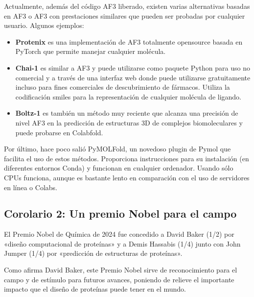 Actualmente, además del código AF3 liberado, existen varias alternativas basadas en AF3 o AF3 con prestaciones similares que pueden ser probadas por cualquier usuario. Algunos ejemplos:
\begin{itemize}
\item \textbf{Protenix} es una implementación de AF3 totalmente opensource basada en PyTorch que permite manejar cualquier molécula.
\item \textbf{Chai-1} es similar a AF3 y puede utilizarse como paquete Python para uso no comercial y a través de una interfaz web donde puede utilizarse gratuitamente incluso para fines comerciales de descubrimiento de fármacos. Utiliza la codificación smiles para la representación de cualquier molécula de ligando.
\item \textbf{Boltz-1} es también un método muy reciente que alcanza una precisión de nivel AF3 en la predicción de estructuras 3D de complejos biomoleculares y puede probarse en Colabfold.
\end{itemize}

Por último, hace poco salió PyMOLFold, un novedoso plugin de Pymol que facilita el uso de estos métodos. Proporciona instrucciones para su instalación (en diferentes entornos Conda) y funcionan en cualquier ordenador. Usando sólo CPUs funciona, aunque es bastante lento en comparación con el uso de servidores en línea o Colabs.

\subsection{Corolario 2: Un premio Nobel para el campo}
El Premio Nobel de Química de 2024 fue concedido a David Baker (1/2) por «diseño computacional de proteínas» y a Demis Hassabis (1/4) junto con John Jumper (1/4) por «predicción de estructuras de proteínas».

Como afirma David Baker, este Premio Nobel sirve de reconocimiento para el campo y de estímulo para futuros avances, poniendo de relieve el importante impacto que el diseño de proteínas puede tener en el mundo.
